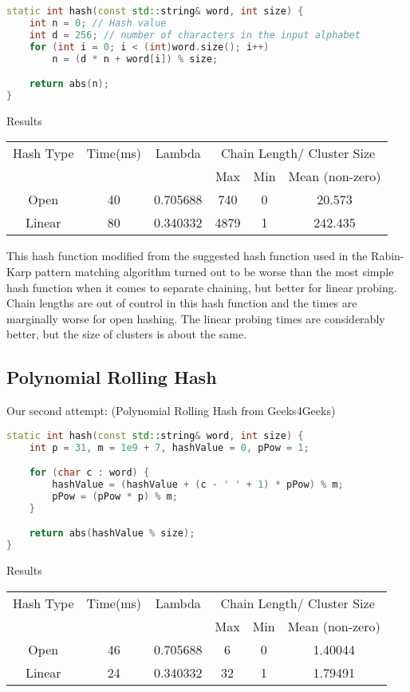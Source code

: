 \documentclass[12pt]{article}
\begin{document}
\begin{lstlisting}[language=C++]
static int hash(const std::string& word, int size) {
    int n = 0; // Hash value
    int d = 256; // number of characters in the input alphabet 
    for (int i = 0; i < (int)word.size(); i++)
        n = (d * n + word[i]) % size;

    return abs(n);
}
\end{lstlisting}

\begin{center}
Results\\
\begin{tabular}{|c|c|c|c|c|c|}
\hline
Hash Type & Time(ms) & Lambda & \multicolumn{3}{|c|}{Chain Length/ Cluster Size} \\
 & & & Max & Min & Mean (non-zero) \\
\hline
Open & 40 & 0.705688 & 740 & 0 & 20.573\\
Linear & 80 & 0.340332 & 4879 & 1 & 242.435\\
\hline
\end{tabular}
\end{center}

This hash function modified from the suggested hash function used in the Rabin-Karp pattern matching algorithm turned out to be worse than the most simple hash function when it comes to separate chaining, but better for linear probing. Chain lengths are out of control in this hash function and the times are marginally worse for open hashing. The linear probing times are considerably better, but the size of clusters is about the same.

\subsection{Polynomial Rolling Hash}

Our second attempt: (Polynomial Rolling Hash from Geeks4Geeks)
\begin{lstlisting}[language=C++]
static int hash(const std::string& word, int size) {
    int p = 31, m = 1e9 + 7, hashValue = 0, pPow = 1;

    for (char c : word) {
        hashValue = (hashValue + (c - ' ' + 1) * pPow) % m;
        pPow = (pPow * p) % m;
    }

    return abs(hashValue % size);
}
\end{lstlisting}

\begin{center}
Results\\
\begin{tabular}{|c|c|c|c|c|c|}
\hline
Hash Type & Time(ms) & Lambda & \multicolumn{3}{|c|}{Chain Length/ Cluster Size} \\
 & & & Max & Min & Mean (non-zero) \\
\hline
Open & 46 & 0.705688 & 6 & 0 & 1.40044\\
Linear & 24 & 0.340332 & 32 & 1 & 1.79491\\
\hline
\end{tabular}
\end{center}
\end{document}
